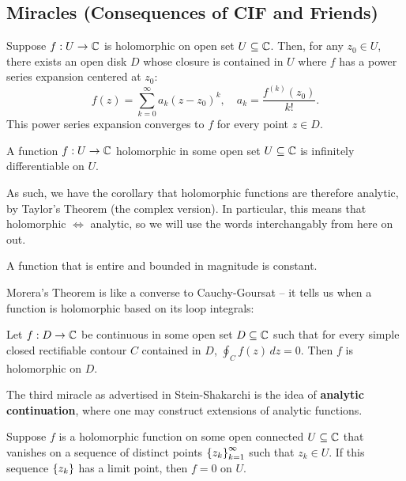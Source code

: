 \subsection{Miracles (Consequences of CIF and Friends)}
\begin{theorem}
  Suppose $f : U \to \mathbb C$ is holomorphic on open set $U \subseteq \mathbb C$. Then, for any $z_0 \in U$, there exists an open disk $D$ whose closure is contained in $U$ where $f$ has a power series expansion centered at $z_0$:
  \[ f(z) = \sum_{k = 0}^\infty a_k (z-z_0)^k, \quad a_k = \frac{f^{(k)}(z_0)}{k!}.\]
  This power series expansion converges to $f$ for every point $z \in D$.
\end{theorem}

\begin{corollary}
  A function $f : U \to \mathbb C$ holomorphic in some open set $U \subseteq \mathbb C$ is infinitely differentiable on $U$.
\end{corollary}
As such, we have the corollary that holomorphic functions are therefore analytic, by Taylor's Theorem (the complex version). In particular, this means that holomorphic $\Leftrightarrow$ analytic, so we will use the words interchangably from here on out.

\begin{theorem}
  A function that is entire and bounded in magnitude is constant.
\end{theorem}


Morera's Theorem is like a converse to Cauchy-Goursat -- it tells us when a function is holomorphic based on its loop integrals:
\begin{theorem}
  Let $f : D \to \mathbb C$ be continuous in some open set $D \subseteq \mathbb C$ such that for every simple closed rectifiable contour $C$ contained in $D$, $\oint_C f(z) \, dz = 0$. Then $f$ is holomorphic on $D$.
\end{theorem}

The third miracle as advertised in Stein-Shakarchi is the idea of \textbf{analytic continuation}, where one may construct extensions of analytic functions.
\begin{theorem}
  Suppose $f$ is a holomorphic function on some open connected $U \subseteq \mathbb C$ that vanishes on a sequence of distinct points $\left\{ z_k \right\}_{k=1}^\infty$ such that $z_k \in U$. If this sequence $\left\{ z_k \right\}$ has a limit point, then $f = 0$ on $U$.
\end{theorem}

